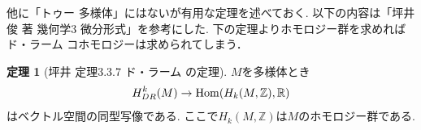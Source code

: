 \documentclass[dvipdfmx,a4paper,11pt]{article}
\newcommand{\R}{\mathbb{R}}
\newcommand{\Z}{\mathbb{Z}}
\theoremstyle{definition}
\newtheorem{thm}{定理}
\begin{document}
他に「トゥー 多様体」にはないが有用な定理を述べておく. 以下の内容は「坪井俊 著 幾何学3 微分形式」を参考にした.
 下の定理よりホモロジー群を求めればド・ラーム コホモロジーは求められてしまう．
\begin{tcolorbox}[
    colback = white,
    colframe = green!35!black,
    fonttitle = \bfseries,
    breakable = true]
\begin{thm}[坪井 定理3.3.7 ド・ラーム の定理]
$M$を多様体とき
$$ H^{k}_{DR}(M) \to {\rm Hom} (H_{k}(M,\Z), \R)
$$
はベクトル空間の同型写像である. 
ここで$H_{k}(M,\Z)$は$M$のホモロジー群である. 
\end{thm}
\end{tcolorbox} 



\end{document}
